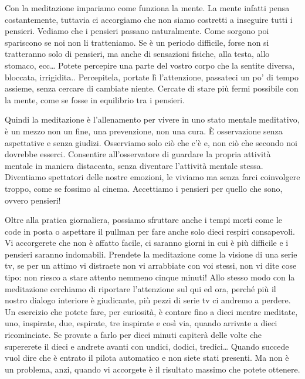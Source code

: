 \documentclass[12pt]{book} %
\begin{document}
Con la meditazione impariamo come funziona la mente. La mente infatti pensa costantemente, tuttavia ci accorgiamo che
non siamo costretti a inseguire tutti i pensieri. Vediamo che i pensieri passano naturalmente. Come sorgono poi
spariscono se noi non li tratteniamo. Se è un periodo difficile, forse non si tratteranno solo di pensieri, ma anche di
sensazioni fisiche, alla testa, allo stomaco, ecc… Potete percepire una parte del vostro corpo che la sentite diversa,
bloccata, irrigidita.. Percepitela, portate lì l'attenzione, passateci un po'
di tempo assieme, senza cercare di cambiate niente. Cercate di stare più fermi possibile con la mente, come se fosse in
equilibrio tra i pensieri.

Quindi la meditazione è l'allenamento per vivere in uno stato mentale meditativo, è un mezzo non un fine, una
prevenzione, non una cura. È osservazione senza aspettative e senza giudizi. Osserviamo solo ciò che c'è e, non ciò che
secondo noi dovrebbe esserci. Consentire all'osservatore di guardare la propria attività mentale in maniera distaccata,
senza diventare l'attività mentale stessa. Diventiamo spettatori delle nostre emozioni, le viviamo
ma senza farci coinvolgere troppo, come se fossimo al cinema. Accettiamo i pensieri per quello che sono, ovvero
pensieri! 

Oltre alla pratica giornaliera, possiamo sfruttare anche i tempi morti come le code in posta o aspettare il pullman per
fare anche solo dieci respiri consapevoli. Vi accorgerete che non è affatto facile, ci saranno giorni in cui è più
difficile e i pensieri saranno indomabili. Prendete la meditazione come la visione di una serie tv, se per un attimo vi
distraete non vi arrabbiate con voi stessi, non vi dite cose tipo: non riesco a stare attento nemmeno cinque minuti!
Allo stesso modo con la meditazione cerchiamo di riportare l'attenzione sul qui ed ora, perché più
il nostro dialogo interiore è giudicante, più pezzi di serie tv ci andremo a perdere. Un esercizio che potete fare, per
curiosità, è contare fino a dieci mentre meditate, uno, inspirate, due, espirate, tre inspirate e così via, quando
arrivate a dieci ricominciate. Se provate a farlo per dieci minuti capiterà delle volte che supererete il dieci e
andrete avanti con undici, dodici, tredici… Quando succede vuol dire che è entrato il pilota automatico e non siete
stati presenti. Ma non è un problema, anzi, quando vi accorgete è il risultato massimo che potete ottenere.
\end{document}
